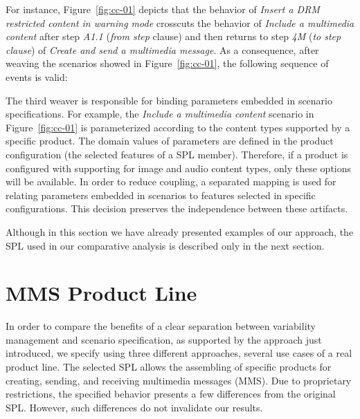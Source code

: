\documentclass{acm_proc_article-sp}
\begin{document}
For instance, Figure~\ref{fig:cc-01} depicts that the behavior of \emph{Insert a DRM restricted content in warning mode} crosscuts the behavior of \emph{Include a multimedia content} after step \emph{A1.1} (\emph{from step} clause) and then returns to step \emph{4M} (\emph{to step clause}) of \emph{Create and send a multimedia message}.  As a consequence, after weaving the scenarios showed in Figure~\ref{fig:cc-01}, the following sequence of events is valid:

\begin{center}
\small{
}
\end{center}

The third weaver is responsible for binding parameters embedded in scenario specifications. For example, the \emph{Include a multimedia content} scenario in Figure~\ref{fig:cc-01} is parameterized according to the content types supported by a specific product. The domain values of parameters are defined in the product configuration (the selected features of a SPL member). Therefore, if a product is configured with supporting for image and audio content types, only these options will be available.  In order to reduce coupling, a separated mapping is used for relating parameters embedded in scenarios to features selected in specific configurations. This decision preserves the independence between these artifacts.

Although in this section we have already presented examples of our approach, the SPL used in our comparative analysis is described only in the next section. 


\section{MMS Product Line}
\label{sec:mms-pl}

In order to compare the benefits of a clear separation between variability management and scenario specification, as supported by the approach just introduced, we specify using three different approaches, several use cases of a real product line. The selected SPL allows the assembling of specific products for creating, sending, and receiving multimedia messages (MMS). Due to proprietary restrictions, the specified behavior presents a few differences from the original SPL. However, such differences do not invalidate our results.
\end{document}

